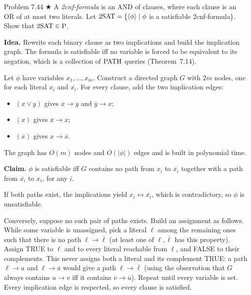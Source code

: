\begin{question}{Problem 7.44 $\bigstar$}
A \emph{2cnf-formula} is an AND of clauses, where each clause is an OR of at most two literals. Let $\mathrm{2SAT}=\{\langle \phi\rangle\mid\phi$ is a satisfiable 2cnf-formula$\}$. Show that $\mathrm{2SAT}\in\mathrm{P}$.
\end{question}
\begin{soln}
\textbf{Idea.} Rewrite each binary clause as two implications and build the implication graph. The formula is satisfiable iff no variable is forced to be equivalent to its negation, which is a collection of $\mathrm{PATH}$ queries (Theorem~7.14).

Let $\phi$ have variables $x_1,\ldots,x_m$. Construct a directed graph $G$ with $2m$ nodes, one for each literal $x_i$ and $\overline{x_i}$. For every clause, add the two implication edges:
\begin{itemize}
\item $(x\lor y)$ gives $\overline{x}\to y$ and $\overline{y}\to x$;
\item $(x)$ gives $\overline{x}\to x$;
\item $(\overline{x})$ gives $x\to\overline{x}$.
\end{itemize}
The graph has $O(m)$ nodes and $O(\lvert\phi\rvert)$ edges and is built in polynomial time.

\begin{center}
\end{center}

\textbf{Claim.} $\phi$ is satisfiable iff $G$ contains no path from $x_i$ to $\overline{x_i}$ together with a path from $\overline{x_i}$ to $x_i$, for any $i$.

If both paths exist, the implications yield $x_i\leftrightarrow\overline{x_i}$, which is contradictory, so $\phi$ is unsatisfiable.

Conversely, suppose no such pair of paths exists. Build an assignment as follows. While some variable is unassigned, pick a literal $\ell$ among the remaining ones such that there is no path $\ell\to\overline{\ell}$ (at least one of $\ell,\overline{\ell}$ has this property). Assign TRUE to $\ell$ and to every literal reachable from $\ell$, and FALSE to their complements. This never assigns both a literal and its complement TRUE: a path $\ell\to a$ and $\ell\to\overline{a}$ would give a path $\ell\to\overline{\ell}$ (using the observation that $G$ always contains $u\to v$ iff it contains $\overline{v}\to\overline{u}$). Repeat until every variable is set. Every implication edge is respected, so every clause is satisfied.


\end{soln}
